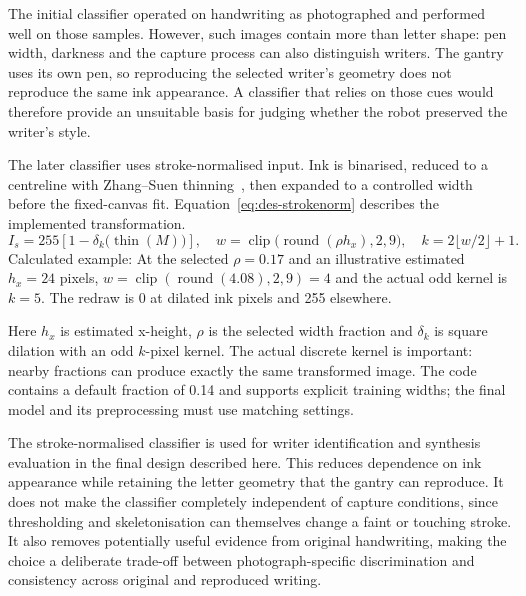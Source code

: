 The initial classifier operated on handwriting as photographed and performed well on those samples. However, such images contain more than letter shape: pen width, darkness and the capture process can also distinguish writers. The gantry uses its own pen, so reproducing the selected writer's geometry does not reproduce the same ink appearance. A classifier that relies on those cues would therefore provide an unsuitable basis for judging whether the robot preserved the writer's style.~\cite[recognise.py; train.py; trainlibrary.py]{braunepipeline2026}

The later classifier uses stroke-normalised input. Ink is binarised, reduced to a centreline with Zhang--Suen thinning~\cite[p.~237]{zhang1984}, then expanded to a controlled width before the fixed-canvas fit. Equation~\ref{eq:des-strokenorm} describes the implemented transformation.
\begin{equation}
I_s=255\left[1-\delta_k\bigl(\operatorname{thin}(M)\bigr)\right],\quad
w=\operatorname{clip}\bigl(\operatorname{round}(\rho h_x),2,9\bigr),\quad
k=2\lfloor w/2\rfloor+1.
\label{eq:des-strokenorm}
\end{equation}
Calculated example: At the selected $\rho=0.17$ and an illustrative estimated $h_x=24$ pixels, $w=\operatorname{clip}(\operatorname{round}(4.08),2,9)=4$ and the actual odd kernel is $k=5$. The redraw is 0 at dilated ink pixels and 255 elsewhere. \cite[recognise.py, StrokeNormalize]{braunepipeline2026}

Here $h_x$ is estimated x-height, $\rho$ is the selected width fraction and $\delta_k$ is square dilation with an odd $k$-pixel kernel. The actual discrete kernel is important: nearby fractions can produce exactly the same transformed image. The code contains a default fraction of 0.14 and supports explicit training widths; the final model and its preprocessing must use matching settings.~\cite[recognise.py; train.py; trainlibrary.py]{braunepipeline2026}

The stroke-normalised classifier is used for writer identification and synthesis evaluation in the final design described here. This reduces dependence on ink appearance while retaining the letter geometry that the gantry can reproduce. It does not make the classifier completely independent of capture conditions, since thresholding and skeletonisation can themselves change a faint or touching stroke. It also removes potentially useful evidence from original handwriting, making the choice a deliberate trade-off between photograph-specific discrimination and consistency across original and reproduced writing.~\cite[recognise.py; train.py; trainlibrary.py]{braunepipeline2026}

